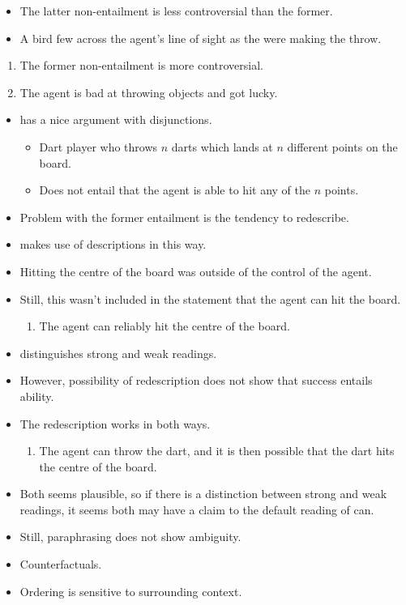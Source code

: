 \documentclass[10pt]{article}
\begin{document}
\begin{itemize}
\item The latter non-entailment is less controversial than the former.
\item A bird few across the agent's line of sight as the were making the throw.
\end{itemize}

\begin{enumerate}
\item The former non-entailment is more controversial.
\item The agent is bad at throwing objects and got lucky.
\end{enumerate}


\begin{itemize}
\item \cite{Boylan:2020aa} has a nice argument with disjunctions.
  \begin{itemize}
  \item Dart player who throws \(n\) darts which lands at \(n\) different points on the board.
  \item Does not entail that the agent is able to hit any of the \(n\) points.
  \end{itemize}
\item Problem with the former entailment is the tendency to redescribe.
\item \citeauthor{Schwarz:2020aa} makes use of descriptions in this way.
\item Hitting the centre of the board was outside of the control of the agent.
\item Still, this wasn't included in the statement that the agent can hit the board.
  \begin{enumerate}
  \item The agent can reliably hit the centre of the board.
  \end{enumerate}
\item \citeauthor{Schwarz:2020aa} distinguishes strong and weak readings.
\item However, possibility of redescription does not show that success entails ability.
\item The redescription works in both ways.
  \begin{enumerate}
  \item The agent can throw the dart, and it is then possible that the dart hits the centre of the board.
  \end{enumerate}
\item Both seems plausible, so if there is a distinction between strong and weak readings, it seems both may have a claim to the default reading of can.
\item Still, paraphrasing does not show ambiguity.
\item Counterfactuals.
\item Ordering is sensitive to surrounding context.
\end{itemize}
\end{document}
